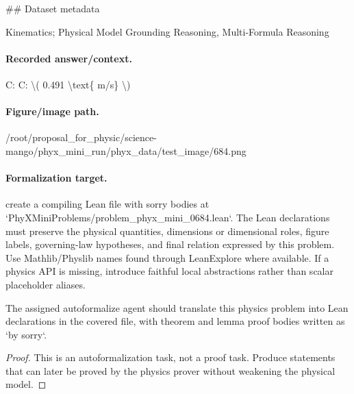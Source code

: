 \#\# Dataset metadata

Kinematics; Physical Model Grounding Reasoning, Multi-Formula Reasoning

\paragraph{Recorded answer/context.}
C: C: \textbackslash{}( 0.491 \textbackslash{}text\{ m/s\} \textbackslash{})

\paragraph{Figure/image path.}
/root/proposal\_for\_physic/science-mango/phyx\_mini\_run/phyx\_data/test\_image/684.png

\paragraph{Formalization target.}
create a compiling Lean file with sorry bodies at `PhyXMiniProblems/problem\_phyx\_mini\_0684.lean`. The Lean declarations must preserve the physical quantities, dimensions or dimensional roles, figure labels, governing-law hypotheses, and final relation expressed by this problem.
Use Mathlib/Physlib names found through LeanExplore where available. If a physics API is missing, introduce faithful local abstractions rather than scalar placeholder aliases.

\begin{theorem}
\label{thm:physics:phyx_mini_0684:target}
The assigned autoformalize agent should translate this physics problem into Lean declarations in the covered file, with theorem and lemma proof bodies written as `by sorry`.
\end{theorem}
\begin{proof}
This is an autoformalization task, not a proof task. Produce statements that can later be proved by the physics prover without weakening the physical model.
\end{proof}

